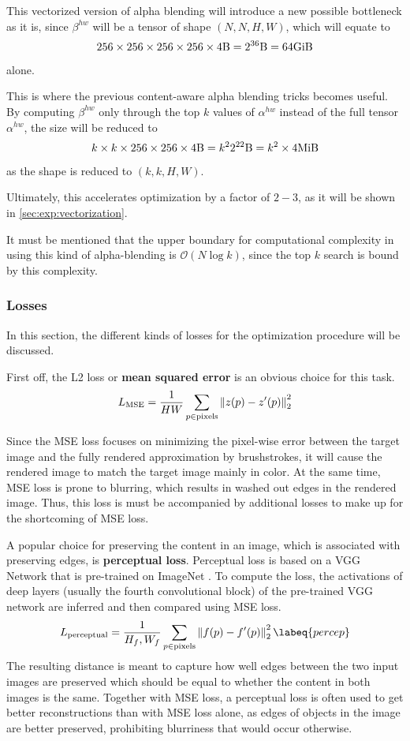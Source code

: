 This vectorized version of alpha blending will introduce a new possible bottleneck as it is, since $\beta^{hw}$ will be a tensor of shape $(N, N, H, W)$, which will equate to
$$
256 \times 256 \times 256 \times 256 \times 4 \si{\byte} = 2^{36}\si{\byte} = 64\si{\gibi\byte}
$$
alone.

This is where the previous content-aware alpha blending tricks becomes useful.
By computing $\beta^{hw}$ only through the top $k$ values of $\alpha^{hw}$ instead of the full tensor $\alpha^{hw}$, the size will be reduced to
$$
k \times k \times 256 \times 256 \times 4 \si{\byte} = k^2 2^{22}\si{\byte} = k^2 \times 4\si{\mebi\byte}
$$
as the shape is reduced to $(k, k, H, W)$.

Ultimately, this accelerates optimization by a factor of $2-3$, as it will be shown in \ref{sec:exp:vectorization}.

It must be mentioned that the upper boundary for computational complexity in using this kind of alpha-blending is $\mathcal{O}(N \log k)$, since the top $k$ search is bound by this complexity.

\subsubsection{Losses}

In this section, the different kinds of losses for the optimization procedure will be discussed.

First off, the L2 loss or \textbf{mean squared error} is an obvious choice for this task.
\begin{align}
    L_{\text{MSE}} = \frac{1}{HW} \sum_{p \in \text{pixels}} \left\lVert z(p) - z'(p)\right\rVert_2^2
\end{align}

Since the MSE loss focuses on minimizing the pixel-wise error between the target image and the fully rendered approximation by brushstrokes, it will cause the rendered image to match the target image mainly in color.
At the same time, MSE loss is prone to blurring, which results in washed out edges in the rendered image.
Thus, this loss is must be accompanied by additional losses to make up for the shortcoming of MSE loss.

A popular choice for preserving the content in an image, which is associated with preserving edges, is \textbf{perceptual loss}.
Perceptual loss is based on a VGG Network \cite{VGG} that is pre-trained on ImageNet \cite{ImageNet}.
To compute the loss, the activations of deep layers (usually the fourth convolutional block) of the pre-trained VGG network are inferred and then compared using MSE loss.
\begin{align}
    L_{\text{perceptual}} = \frac{1}{H_f, W_f} \sum_{p \in \text{pixels}} \norm{f(p) - f'(p)}_2^2
    \labeq{percep}
\end{align}
The resulting distance is meant to capture how well edges between the two input images are preserved which should be equal to whether the content in both images is the same.
Together with MSE loss, a perceptual loss is often used to get better reconstructions than with MSE loss alone, as edges of objects in the image are better preserved, prohibiting blurriness that would occur otherwise.

